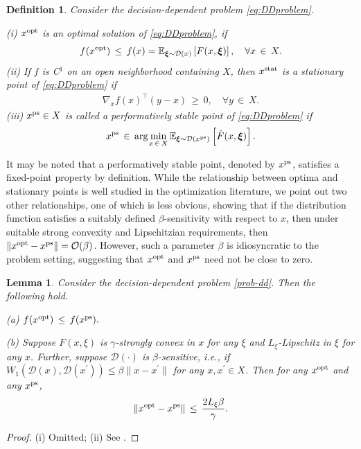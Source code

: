 \documentclass[11pt,reqno]{amsart}
\newcommand{\1}{{\bf 1}}
\newcommand{\2}{{\bf 2}}
\newcommand{\bxi}{\boldsymbol{\xi}}
\numberwithin{equation}{section}
\newtheorem{lemma}{Lemma}[section]
\newtheorem{definition}{Definition}[section]
\theoremstyle{remark}
\begin{document}
{				\medskip
				
				\begin{definition}\label{def:eq}
					Consider the decision-dependent problem \eqref{eq:DDproblem}. 
					
					\noindent (i) $x^{\rm opt}$ is an optimal solution of \eqref{eq:DDproblem}, if 
					\begin{align}
						f(x^{\rm opt}) \, \le \, f(x) = \mathbb{E}_{\bxi \sim {\mathcal{D}}(x)} \left[ F(x,\bxi) \right], \quad \forall x \, \in \, X.
					\end{align}
					\noindent (ii) If $f$ is C$^1$ on an open neighborhood containing $X$, then $x^{\rm stat}$ is a stationary point of \eqref{eq:DDproblem} if 
					\begin{align}
						\nabla_x f(x)^\top (y - x) \, \ge \, 0, \quad \forall y \, \in \, X.
					\end{align}
					\noindent (iii)  $x^{\rm ps} \in X$ is called a performatively stable point  of  \eqref{eq:DDproblem} if
					\begin{equation}
						x^{\rm ps} \, \in \, {\displaystyle \text{arg}\hspace{-0.01in}\min_{x \, \in \, X}} \, \mathbb{E}_{\bxi \sim \mathcal{D}({x^{\rm ps}})} \left[\hat{F}(x, \bxi)\right]. 
					\end{equation} 
				\end{definition}
				{It may be noted that a performatively stable point, denoted by}  $x^{\rm ps}$, satisfies a fixed-point property by definition. While the relationship between optima and stationary points is well studied in the optimization literature, we point out two other relationships, one of which is less obvious, showing that if the distribution function satisfies a suitably defined ${\beta}$-sensitivity with respect to $x$, then under suitable strong convexity and Lipschitzian requirements, then $\|x^{\rm opt}-x^{\rm ps}\| = \mathcal{O}({\beta})$. {However, such a parameter $\beta$ is idiosyncratic to the problem setting, suggesting that $x^{\rm opt}$ and $x^{\rm ps}$ need not be close to zero.  } 
				
				\begin{lemma} Consider the decision-dependent problem \eqref{prob-dd}. Then the following hold.
					
					\noindent (a) $f(x^{\rm opt}) \, \le \, f(x^{\rm ps}).$
					
					\noindent (b) Suppose $F(x,\xi)$ is $\gamma$-strongly convex in $x$ for any $\xi$ and $L_{\xi}$-Lipschitz in $\xi$ for any $x$. Further, suppose ${\mathcal{D}}(\cdot)$ is ${\beta}$-sensitive, i.e., if $W_1({\mathcal{D}}(x),{\mathcal{D}}(x^\prime)) \le {\beta} \| x-x^\prime\|$ for any $x,x^{\prime} \in X$. Then for any $x^{\rm opt}$ and any $x^{\rm ps}$, 
					$$\| x^{\rm opt}-x^{\rm ps} \| \, \le \, \frac{2L_{\xi} {\beta}}{\gamma}.$$  
				\end{lemma}
				\begin{proof} (i) Omitted; (ii) See \cite[Theorem 4.3]{perdomo2020performative}.
				\end{proof}
				
}
\end{document}
